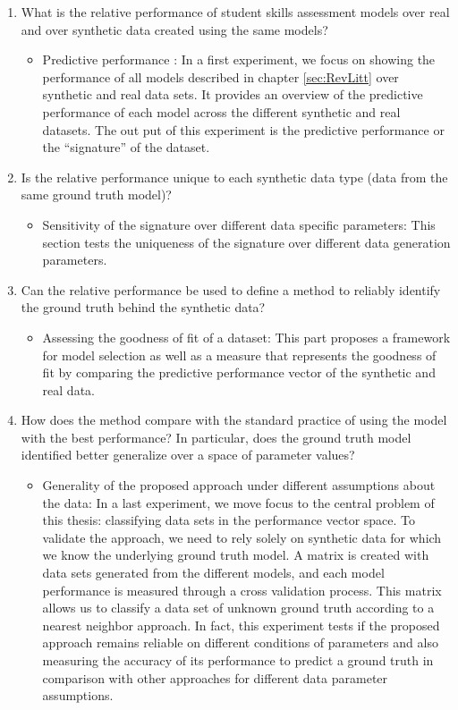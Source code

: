 \begin{enumerate}
\item What is the relative performance of student skills assessment models over real and over synthetic data created using the same models?
\begin{itemize}
\item Predictive performance : In a first experiment, we focus on showing the performance of all models described in chapter \ref{sec:RevLitt} over synthetic and real data sets.  It provides an overview of the predictive performance of each model across the different synthetic and real datasets. The out put of this experiment is the predictive performance or the ``signature'' of the dataset.
\end{itemize}
\item Is the relative performance unique to each synthetic data type (data from the same ground truth model)?
\begin{itemize}
\item Sensitivity of the signature over different data specific parameters: This section tests the uniqueness of the signature over different data generation parameters.
\end{itemize}
\item Can the relative performance be used to define a method to reliably identify the ground truth behind the synthetic data?
\begin{itemize}
\item Assessing the goodness of fit of a dataset: This part proposes a framework for model selection as well as a measure that represents the goodness of fit by comparing the predictive performance vector of the synthetic and real data.
\end{itemize}
\item How does the method compare with the standard practice of using the model with the best performance?  In particular, does the ground truth model identified better generalize over a space of parameter values?
\begin{itemize}
\item Generality of the proposed approach under different assumptions about the data: In a last experiment, we move focus to the central problem of this thesis: classifying data sets in the performance vector space.  To validate the approach, we need to rely solely on synthetic data for which we know the underlying ground truth model.  A matrix is created with data sets generated from the different models, and each model performance is measured through a cross validation process.  This matrix allows us to classify a data set of unknown ground truth according to a nearest neighbor approach. In fact, this experiment tests if the proposed approach remains reliable on different conditions of parameters and also measuring the accuracy of its performance to predict a ground truth in comparison with other approaches for different data parameter assumptions.
\end{itemize}
\end{enumerate}


